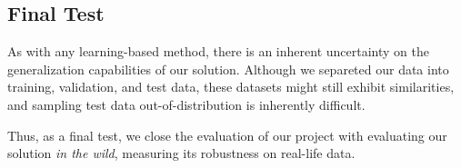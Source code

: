 \subsection{Final Test}
As with any learning-based method, there is an inherent uncertainty on the
generalization capabilities of our solution. Although we separeted our data into
training, validation, and test data, these datasets might still exhibit
similarities, and sampling test data out-of-distribution is inherently
difficult.

Thus, as a final test, we close the evaluation of our project with evaluating
our solution \textit{in the wild}, measuring its robustness on real-life data.

